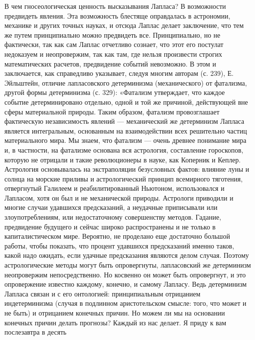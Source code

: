 В чем  гносеологическая ценность  высказывания Лапласа?  В возможности
предвидеть явления. Эта возможность блестяще оправдалась в астрономии,
механике и  других точных науках,  и отсюда Лаплас  делает заключение,
что тем же путем принципиально можно предвидеть все. Принципиально, но
не  фактически, так  как сам  Лаплас отчетливо  сознает, что  этот его
постулат недоказуем и неопровержим, так как там, где нельзя произвести
строгих  математических  расчетов,   предвидение  событий  невозможно.
В  этом  и  заключается,  как  справедливо  указывает,  следуя  многим
авторам  (с. 239),  Е. Эйльштейн,  отличие лапласовского  детерминизма
(механического)  от фатализма,  другой  формы  детерминизма (с.  329):
«Фатализм  утверждает, что  каждое  событие детерминировано  отдельно,
одной и той  же причиной, действующей вне  сферы материальной природы.
Таким  образом,   фатализм  провозглашает   фактическую  независимость
явлений --- механический же детерминизм Лапласа является интегральным,
основанным  на  взаимодействии  всех решительно  частиц  материального
мира.  Мы  знаем,  что  фатализм  ---  очень  древнее  понимание  мира
и,  в частности,  на  фатализме основана  вся астрология,  составление
гороскопов,  которую  не  отрицали  и  такие  революционеры  в  науке,
как  Коперник  и  Кеплер.  Астрология  основывалась  на  экстраполяции
безусловных  фактов:  влияние  луны  и солнца  на  морские  приливы  и
астрологический принцип  всемирного тяготения, отвергнутый  Галилеем и
реабилитированный  Ньютоном, использовался  и  Лапласом,  хотя он  был
и  не  механической  природы.  Астрологи  приводили  и  многие  случаи
удавшихся предсказаний, а  неудачные приписывали или злоупотреблениям,
или недостаточному совершенству методов. Гадание, предвидение будущего
и  сейчас  широко  распространены  и  не  только  в  капиталистическом
мире.  Вероятно, не  проделано  еще достаточно  большой работы,  чтобы
показать,  что  процент  удавшихся предсказаний  именно  таков,  какой
надо  ожидать,  если  удачные   предсказания  являются  делом  случая.
Поэтому астрологические  методы могут быть  опровергнуты, лапласовский
же  детерминизм неопровержим  непосредственно.  Но  косвенно он  может
быть  опровергнут, и  это  опровержение известно  каждому, конечно,  и
самому Лапласу.  Ведь детерминизм Лапласа  связан и с  его онтологией:
принципиальным   отрицанием   индетерминизма   (случая   в   подлинном
аристотельском  смысле:  того,  что  может и  не  быть)  и  отрицанием
конечных причин.  Но можем ли  мы на основании конечных  причин делать
прогнозы? Каждый  из нас делает.  Я приду  к вам послезавтра  в десять
